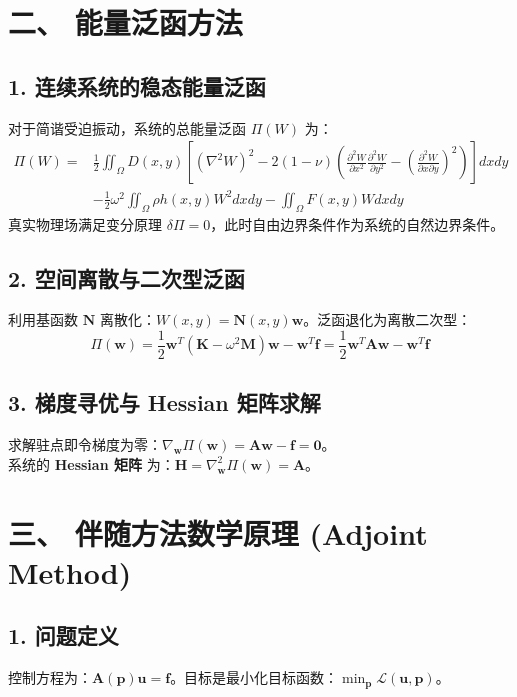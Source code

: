 \documentclass[11pt,a4paper]{article}
\begin{document}
\section*{二、 能量泛函方法}

\subsection*{1. 连续系统的稳态能量泛函}
对于简谐受迫振动，系统的总能量泛函 $\Pi(W)$ 为：
\begin{equation}
\begin{aligned} 
    \Pi(W) =& \frac{1}{2} \iint_{\Omega} D(x,y) \left[ (\nabla^2 W)^2 - 2(1-\nu)\left( \frac{\partial^2 W}{\partial x^2}\frac{\partial^2 W}{\partial y^2} - \left(\frac{\partial^2 W}{\partial x \partial y}\right)^2 \right) \right] dxdy \\ 
    &- \frac{1}{2} \omega^2 \iint_{\Omega} \rho h(x,y) W^2 dxdy - \iint_{\Omega} F(x,y) W dxdy 
\end{aligned}
\end{equation}
真实物理场满足变分原理 $\delta \Pi = 0$，此时自由边界条件作为系统的自然边界条件。

\subsection*{2. 空间离散与二次型泛函}
利用基函数 $\mathbf{N}$ 离散化：$W(x,y) = \mathbf{N}(x,y) \mathbf{w}$。泛函退化为离散二次型：
\begin{equation}
    \Pi(\mathbf{w}) = \frac{1}{2} \mathbf{w}^T (\mathbf{K} - \omega^2 \mathbf{M}) \mathbf{w} - \mathbf{w}^T \mathbf{f} = \frac{1}{2} \mathbf{w}^T \mathbf{A} \mathbf{w} - \mathbf{w}^T \mathbf{f}
\end{equation}

\subsection*{3. 梯度寻优与 Hessian 矩阵求解}
求解驻点即令梯度为零：$\nabla_{\mathbf{w}} \Pi(\mathbf{w}) = \mathbf{A} \mathbf{w} - \mathbf{f} = \mathbf{0}$。\\
系统的 \textbf{Hessian 矩阵} 为：$\mathbf{H} = \nabla_{\mathbf{w}}^2 \Pi(\mathbf{w}) = \mathbf{A}$。

\section*{三、 伴随方法数学原理 (Adjoint Method)}

\subsection*{1. 问题定义}
控制方程为：$\mathbf{A}(\mathbf{p}) \mathbf{u} = \mathbf{f}$。目标是最小化目标函数：$\min_{\mathbf{p}} \mathcal{L}(\mathbf{u}, \mathbf{p})$。
\end{document}
